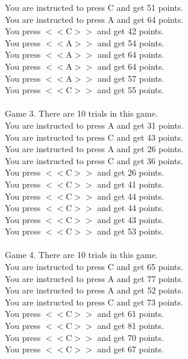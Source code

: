 \documentclass[pdflatex,sn-nature]{sn-jnl}%
\theoremstyle{thmstyleone}%
\theoremstyle{thmstyletwo}%
\theoremstyle{thmstylethree}%
\begin{document}
You are instructed to press C and get 51 points. $~$\\ 
You are instructed to press A and get 64 points. $~$\\ 
You press $<<$C$>>$ and get 42 points. $~$\\ 
You press $<<$A$>>$ and get 54 points. $~$\\ 
You press $<<$A$>>$ and get 64 points. $~$\\ 
You press $<<$A$>>$ and get 64 points. $~$\\ 
You press $<<$A$>>$ and get 57 points. $~$\\ 
You press $<<$C$>>$ and get 55 points. $~$\\ 
 $~$\\ 
Game 3. There are 10 trials in this game. $~$\\ 
You are instructed to press A and get 31 points. $~$\\ 
You are instructed to press C and get 43 points. $~$\\ 
You are instructed to press A and get 26 points. $~$\\ 
You are instructed to press C and get 36 points. $~$\\ 
You press $<<$C$>>$ and get 26 points. $~$\\ 
You press $<<$C$>>$ and get 41 points. $~$\\ 
You press $<<$C$>>$ and get 44 points. $~$\\ 
You press $<<$C$>>$ and get 44 points. $~$\\ 
You press $<<$C$>>$ and get 43 points. $~$\\ 
You press $<<$C$>>$ and get 53 points. $~$\\ 
 $~$\\ 
Game 4. There are 10 trials in this game. $~$\\ 
You are instructed to press C and get 65 points. $~$\\ 
You are instructed to press A and get 77 points. $~$\\ 
You are instructed to press A and get 52 points. $~$\\ 
You are instructed to press C and get 73 points. $~$\\ 
You press $<<$C$>>$ and get 61 points. $~$\\ 
You press $<<$C$>>$ and get 81 points. $~$\\ 
You press $<<$C$>>$ and get 70 points. $~$\\ 
You press $<<$C$>>$ and get 67 points. $~$\\ 
\end{document}
